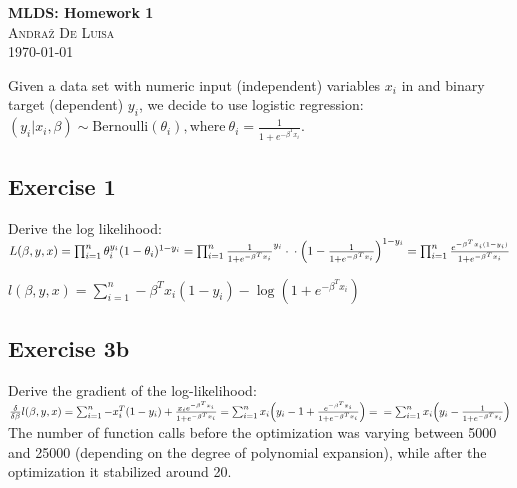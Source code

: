 \documentclass[twocolumn, 8pt]{article}
\begin{document}
\begin{center}

\Large{\textbf{MLDS: Homework 1}} \\
\textsc{\large{Andraž De Luisa}} \\
\vspace{6pt}
\small{\today}

\end{center}

Given a data set with numeric input (independent) variables $x_i$  in and binary target (dependent) $y_i$, we decide to use logistic regression: $(y_i|x_i,\beta) \sim \text{Bernoulli}(\theta_i), \text{where} ~
 \theta_i = \frac{1}{1+e^{-\beta^T x_i}}$.

\subsection*{Exercise 1} Derive the log likelihood: \\

\begin{math} 
    L(\beta, y, x) = \prod_{i=1}^n \theta_i^{y_i} (1-\theta_i)^{1-y_i} = \prod_{i=1}^n \frac{1}{1+e^{-\beta^T x_i}}^{y_i} \cdot \\
    \cdot \Big(1-\frac{1}{1+e^{-\beta^T x_i}}\Big)^{1-y_i} = \prod_{i=1}^n \frac{e^{-\beta^T x_i (1-y_i)}}{1+e^{-\beta^T x_i}}
\end{math}

\begin{math}
    l(\beta, y, x) = \sum_{i=1}^n -\beta^T x_i (1-y_i) - \log{(1 + e^{-\beta^T x_i})}
\end{math}

\subsection*{Exercise 3b} Derive the gradient of the log-likelihood: \\

\begin{math}
    \frac{\delta}{\delta \beta} l(\beta, y, x) = \sum_{i=1}^{n} -x_i^T (1-y_i) + \frac{x_i e^{-\beta^T x_i}}{1 + e^{-\beta^T x_i}} = \sum_{i=1}^{n} x_i \Big(y_i - 1 + \frac{e^{-\beta^T x_i}}{1 + e^{-\beta^T x_i}} \Big) = \\ 
    = \sum_{i=1}^{n} x_i \Big(y_i - \frac{1}{1 + e^{-\beta^T x_i}}\Big)
\end{math} \\

The number of function calls before the optimization was varying between 5000 and 25000 (depending on the degree of polynomial expansion), while after the optimization it stabilized around 20.
\end{document}
